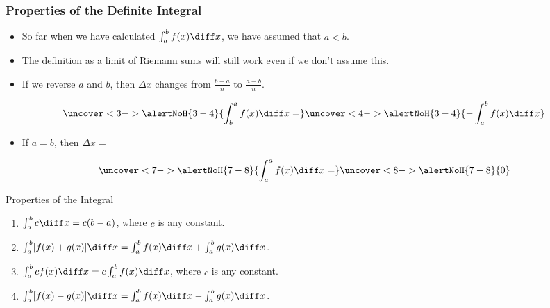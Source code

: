 \begin{frame}
\frametitle{Properties of the Definite Integral}
\begin{itemize}
\item  So far when we have calculated $\int_a^b f(x)\diff x$, we have assumed that $a < b$.
\item  The definition as a limit of Riemann sums will still work even if we don't assume this.
\item<2->  If we reverse $a$ and $b$, then $\Delta x$ changes from $\frac{b-a}{n}$ to $\frac{a-b}{n}$.
\end{itemize}
\[
\uncover<3->{%
\alertNoH{ 3-4}{%
\int_b^a f(x)\diff x = %
}%
}%
\uncover<4->{%
\alertNoH{ 3-4}{%
- \int_a^b f(x)\diff x %
}%
}%
\]
\begin{itemize}
\item<5-| alert@5-6>  If $a = b$, then $\Delta x = $ 
\end{itemize}
\[
\uncover<7->{%
\alertNoH{ 7-8}{%
\int_a^a f(x) \diff x = %
}%
}%
\uncover<8->{%
\alertNoH{ 7-8}{%
0 %
}%
}%
\]
\end{frame}

\begin{frame}
Properties of the Integral
\begin{enumerate}
\item<1-| alert@2>  $\int_a^b c\diff x = c(b-a)$, where $c$ is any constant.
\item<1-| alert@3>  $\int_a^b [f(x)+g(x)] \diff x = \int_a^b f(x)\diff x + \int_a^b g(x) \diff x$.
\item<1-| alert@4>  $\int_a^b cf(x) \diff x = c\int_a^b f(x)\diff x$, where $c$ is any constant.
\item<1-| alert@5>  $\int_a^b [f(x)-g(x)] \diff x = \int_a^b f(x)\diff x - \int_a^b g(x) \diff x$.
\end{enumerate}
\end{frame}

